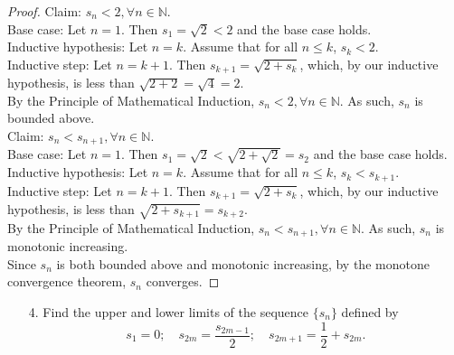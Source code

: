 \documentclass[10pt]{article}
\theoremstyle{definition}
\theoremstyle{plain}
\newcommand{\N}{\mathbb{N}}
\begin{document}
\begin{proof}
Claim: $s_n < 2, \forall n\in\N$. \\

Base case: Let $n=1$. Then $s_1=\sqrt{2}<2$ and the base case holds. \\

Inductive hypothesis: Let $n=k$. Assume that for all $n\leq k$, $s_k < 2.$ \\

Inductive step: Let $n=k+1$. Then $s_{k+1} = \sqrt{2+s_k}$, which, by our inductive hypothesis, is less than $\sqrt{2+2}=\sqrt{4}=2$. \\

By the Principle of Mathematical Induction, $s_n < 2, \forall n\in\N$. As such, $s_n$ is bounded above. \\

Claim: $s_n<s_{n+1}, \forall n\in\N.$ \\

Base case: Let $n=1$. Then $s_1=\sqrt{2}<\sqrt{2+\sqrt{2}} = s_{2}$ and the base case holds. \\

Inductive hypothesis: Let $n=k$. Assume that for all $n\leq k$, $s_k < s_{k+1}.$ \\

Inductive step: Let $n=k+1$. Then $s_{k+1} = \sqrt{2+s_k}$, which, by our inductive hypothesis, is less than $\sqrt{2+s_{k+1}}=s_{k+2}$. \\

By the Principle of Mathematical Induction, $s_n < s_{n+1}, \forall n\in\N$. As such, $s_n$ is monotonic increasing. \\

Since $s_n$ is both bounded above and monotonic increasing, by the monotone convergence theorem, $s_n$ converges.

\end{proof}



\pagebreak



\begin{enumerate}
\item[4.] Find the upper and lower limits of the sequence $\{s_n\}$ defined by
$$s_1=0; \quad s_{2m}=\frac{s_{2m-1}}{2}; \quad s_{2m+1}=\frac{1}{2} + s_{2m}.$$
\end{enumerate}
\end{document}
